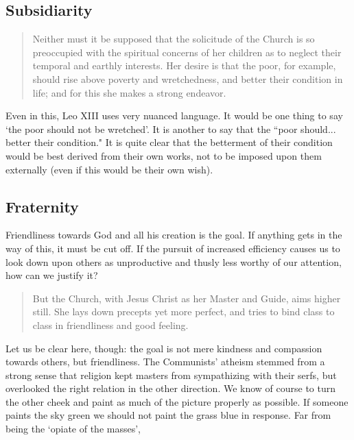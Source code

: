 \documentclass[letterpaper]{article}
\begin{document}
\hfill

\subsection{Subsidiarity}

\begin{quote}
  Neither must it be supposed that the solicitude of the Church is so preoccupied with the spiritual concerns of her children as to neglect their temporal and earthly interests. Her desire is that the poor, for example, should rise above poverty and wretchedness, and better their condition in life; and for this she makes a strong endeavor.
\end{quote}

Even in this, Leo XIII uses very nuanced language. It would be one thing to say `the poor should not be wretched'. It is another to say that the ``poor should... better their condition."  It is quite clear that the betterment of their condition would be best derived from their own works, not to be imposed upon them externally (even if this would be their own wish).

\subsection{Fraternity}

Friendliness towards God and all his creation is the goal. If anything gets in the way of this, it must be cut off. If the pursuit of increased efficiency causes us to look down upon others as unproductive and thusly less worthy of our attention, how can we justify it?

\begin{quote}
  But the Church, with Jesus Christ as her Master and Guide, aims higher still. She lays down precepts yet more perfect, and tries to bind class to class in friendliness and good feeling.
\end{quote}

Let us be clear here, though: the goal is not mere kindness and compassion towards others, but friendliness. The Communists' atheism stemmed from a strong sense that religion kept masters from sympathizing with their serfs, but overlooked the right relation in the other direction. We know of course to turn the other cheek and paint as much of the picture properly as possible. If someone paints the sky green we should not paint the grass blue in response. Far from being the `opiate of the masses',
\end{document}
